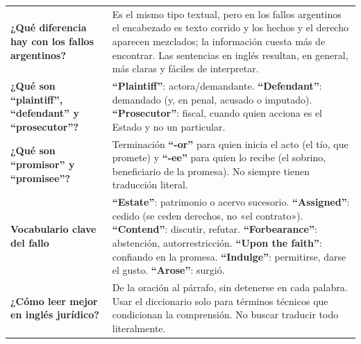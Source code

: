 \documentclass[12pt,oneside]{book}
\begin{document}
\begin{longtable}{
    >{\raggedright\arraybackslash}p{}
    >{\raggedright\arraybackslash}p{}
}
\textbf{¿Qué diferencia hay con los fallos argentinos?} &
Es el mismo tipo textual, pero en los fallos argentinos el encabezado es texto corrido y los hechos y el derecho aparecen mezclados; la información cuesta más de encontrar. Las sentencias en inglés resultan, en general, más claras y fáciles de interpretar. \\

\textbf{¿Qué son ``plaintiff'', ``defendant'' y ``prosecutor''?} &
\textbf{``Plaintiff''}: actora/demandante. \textbf{``Defendant''}: demandado (y, en penal, acusado o imputado). \textbf{``Prosecutor''}: fiscal, cuando quien acciona es el Estado y no un particular. \\

\textbf{¿Qué son ``promisor'' y ``promisee''?} &
Terminación \textbf{``-or''} para quien inicia el acto (el tío, que promete) y \textbf{``-ee''} para quien lo recibe (el sobrino, beneficiario de la promesa). No siempre tienen traducción literal. \\

\textbf{Vocabulario clave del fallo} &
\textbf{``Estate''}: patrimonio o acervo sucesorio. \textbf{``Assigned''}: cedido (se ceden derechos, no «el contrato»). \textbf{``Contend''}: discutir, refutar. \textbf{``Forbearance''}: abstención, autorrestricción. \textbf{``Upon the faith''}: confiando en la promesa. \textbf{``Indulge''}: permitirse, darse el gusto. \textbf{``Arose''}: surgió. \\

\textbf{¿Cómo leer mejor en inglés jurídico?} &
De la oración al párrafo, sin detenerse en cada palabra. Usar el diccionario solo para términos técnicos que condicionan la comprensión. No buscar traducir todo literalmente. \\


\end{longtable}
\end{document}
